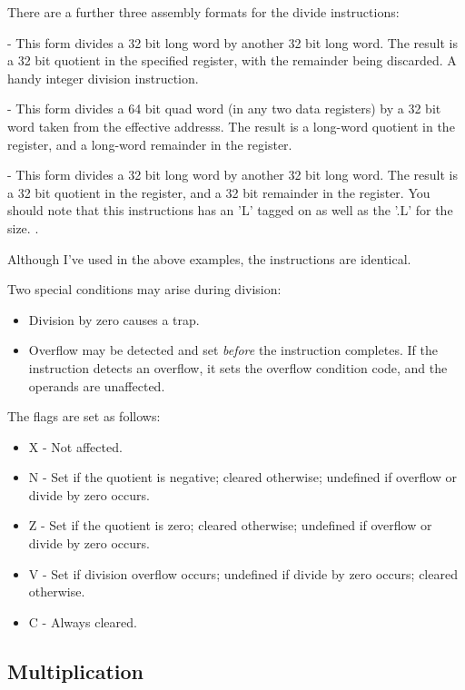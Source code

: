 There are a further three assembly formats for the divide instructions:

 - This form divides a 32 bit long word by another 32 bit long word. The result is a 32 bit quotient in the specified register, with the remainder being discarded. A handy integer division instruction.

 - This form divides a 64 bit quad word (in any two data registers) by a 32 bit word taken from the effective addresss. The result is a long-word quotient in the  register, and a long-word remainder in the  register.

 - This form divides a 32 bit long word by another 32 bit long word. The result is a 32 bit quotient  in the  register, and a 32 bit remainder in the  register. You should note that this instructions has an 'L' tagged on as well as the '.L' for the size. .

Although I've used  in the above examples, the  instructions are identical.

Two special conditions may arise during division:

\begin{itemize}
    \item Division by zero causes a trap.
    \item Overflow may be detected and set \emph{before} the instruction completes. If the instruction detects an overflow, it sets the overflow condition code, and the operands are unaffected.
\end{itemize}

The flags are set as follows:

\begin{itemize}
    \item X - Not affected.
    \item N - Set if the quotient is negative; cleared otherwise; undefined if overflow or divide by zero occurs.
    \item Z - Set if the quotient is zero; cleared otherwise; undefined if overflow or divide by zero occurs.
    \item V - Set if division overflow occurs; undefined if divide by zero occurs; cleared otherwise.
    \item C - Always cleared.
\end{itemize}

\subsection{Multiplication}

